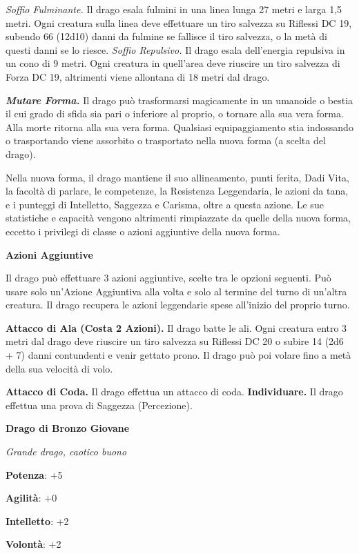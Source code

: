 \begin{multicols}{2}
\emph{Soffio Fulminante.} Il drago esala fulmini in una linea lunga 27
metri e larga 1,5 metri. Ogni creatura sulla linea deve effettuare un
tiro salvezza su Riflessi DC 19, subendo 66 (12d10) danni da fulmine se
fallisce il tiro salvezza, o la metà di questi danni se lo riesce.
\emph{Soffio Repulsivo.} Il drago esala dell'energia repulsiva in un
cono di 9 metri. Ogni creatura in quell'area deve riuscire un tiro
salvezza di Forza DC 19, altrimenti viene allontana di 18 metri dal
drago.

\emph{\textbf{Mutare Forma.}} Il drago può trasformarsi magicamente in
un umanoide o bestia il cui grado di sfida sia pari o inferiore al
proprio, o tornare alla sua vera forma. Alla morte ritorna alla sua vera
forma. Qualsiasi equipaggiamento stia indossando o trasportando viene
assorbito o trasportato nella nuova forma (a scelta del drago).

Nella nuova forma, il drago mantiene il suo allineamento, punti ferita,
Dadi Vita, la facoltà di parlare, le competenze, la Resistenza
Leggendaria, le azioni da tana, e i punteggi di Intelletto, Saggezza e
Carisma, oltre a questa azione. Le sue statistiche e capacità vengono
altrimenti rimpiazzate da quelle della nuova forma, eccetto i privilegi
di classe o azioni aggiuntive della nuova forma.

\textbf{Azioni Aggiuntive}

Il drago può effettuare 3 azioni aggiuntive, scelte tra le opzioni
seguenti. Può usare solo un'Azione Aggiuntiva alla volta e solo al
termine del turno di un'altra creatura. Il drago recupera le azioni
leggendarie spese all'inizio del proprio turno.

\textbf{Attacco di Ala (Costa 2 Azioni).} Il drago batte le ali. Ogni
creatura entro 3 metri dal drago deve riuscire un tiro salvezza su Riflessi DC 20 o subire 14 (2d6 + 7) danni contundenti e venir gettato
prono. Il drago può poi volare fino a metà della sua velocità di volo.

\textbf{Attacco di Coda.} Il drago effettua un attacco di coda.
\textbf{Individuare.} Il drago effettua una prova di Saggezza
(Percezione).



\textbf{Drago di Bronzo Giovane}

\emph{Grande drago, caotico buono}

\textbf{Potenza}: +5

\textbf{Agilità}: +0

\textbf{Intelletto}: +2

\textbf{Volontà}: +2


\end{multicols}
